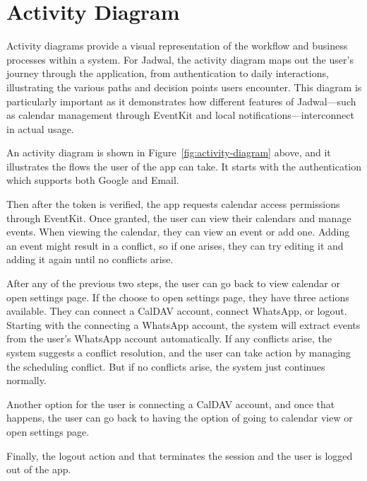 \section{Activity Diagram}

Activity diagrams provide a visual representation of the workflow and business processes within a system. For Jadwal, the activity diagram maps out the user's journey through the application, from authentication to daily interactions, illustrating the various paths and decision points users encounter. This diagram is particularly important as it demonstrates how different features of Jadwal—such as calendar management through EventKit and local notifications—interconnect in actual usage.

An activity diagram is shown in Figure~\ref{fig:activity-diagram} above, and it illustrates the flows the user of the app can take. It starts with the authentication which supports both Google and Email.

Then after the token is verified, the app requests calendar access permissions through EventKit. Once granted, the user can view their calendars and manage events. When viewing the calendar, they can view an event or add one. Adding an event might result in a conflict, so if one arises, they can try editing it and adding it again until no conflicts arise.

After any of the previous two steps, the user can go back to view calendar or open settings page. If the choose to open settings page, they have three actions available. They can connect a CalDAV account, connect WhatsApp, or logout. Starting with the connecting a WhatsApp account, the system will extract events from the user's WhatsApp account automatically. If any conflicts arise, the system suggests a conflict resolution, and the user can take action by managing the scheduling conflict. But if no conflicts arise, the system just continues normally.

Another option for the user is connecting a CalDAV account, and once that happens, the user can go back to having the option of going to calendar view or open settings page.

Finally, the logout action and that terminates the session and the user is logged out of the app.


